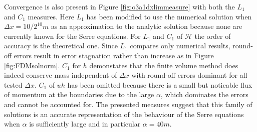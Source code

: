 \documentclass[SingleSpace,12pt,Journal]{Serre_ASCE}
\begin{document}
Convergence is also present in Figure \ref{fig:o3a1dxlimmeasure} with both the $L_1$ and $C_1$ measures. Here $L_1$ has been modified to use the numerical solution when $\Delta x = 10 / 2^{10}m$ as an approximation to the analytic solution because none are currently known for the Serre equations. For $L_1$ and $C_1$ of $\mathcal{H}$ the order of accuracy is the theoretical one. Since $L_1$ compares only numerical results, round-off errors result in error stagnation rather than increase as in Figure \ref{fig:FDMsolnorm}. $C_1$ for $h$ demonstates that the finite volume method does indeed conserve mass independent of $\Delta x$ with round-off errors dominant for all tested $\Delta x$. $C_1$ of $uh$ has been omitted because there is a small but noticable flux of momentum at the boundaries due to the large $\alpha$, which dominates the errors and cannot be accounted for. The presented measures suggest that this family of solutions is an accurate representation of the behaviour of the Serre equations when $\alpha$ is sufficiently large and in particular $\alpha = 40m$. 
\end{document}
